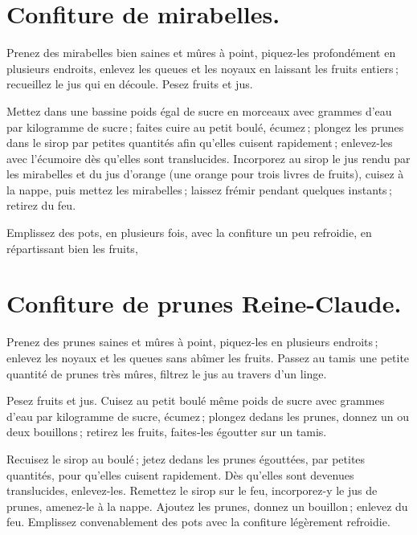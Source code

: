 \section*{\centering Confiture de mirabelles.}
{}

Prenez des mirabelles bien saines et mûres à point, piquez-les profondément en
plusieurs endroits, enlevez les queues et les noyaux en laissant les fruits
entiers ; recueillez le jus qui en découle. Pesez fruits et jus.

Mettez dans une bassine poids égal de sucre en morceaux avec {\mmm}
grammes d'eau par kilogramme de sucre ; faites cuire au petit boulé, écumez ;
plongez les prunes dans le sirop par petites quantités afin qu'elles cuisent
rapidement ; enlevez-les avec l'écumoire dès qu'elles sont translucides.
Incorporez au sirop le jus rendu par les mirabelles et du jus d'orange (une
orange pour trois livres de fruits), cuisez à la nappe, puis mettez les
mirabelles ; laissez frémir pendant quelques instants ; retirez du feu.

Emplissez des pots, en plusieurs fois, avec la confiture un peu refroidie, en
répartissant bien les fruits,

\section*{\centering Confiture de prunes Reine-Claude.}
{}

Prenez des prunes saines et mûres à point, piquez-les en plusieurs endroits ;
enlevez les noyaux et les queues sans abîmer les fruits. Passez au tamis une
petite quantité de prunes très mûres, filtrez le jus au travers d'un linge.

Pesez fruits et jus. Cuisez au petit boulé même poids de sucre avec
{\mmm} grammes d'eau par kilogramme de sucre, écumez ; plongez dedans
les prunes, donnez un ou deux bouillons ; retirez les fruits, faites-les
égoutter sur un tamis.

Recuisez le sirop au boulé ; jetez dedans les prunes égouttées, par petites
quantités, pour qu'elles cuisent rapidement. Dès qu'elles sont devenues
translucides, enlevez-les. Remettez le sirop sur le feu, incorporez-y le jus de
prunes, amenez-le à la nappe. Ajoutez les prunes, donnez un bouillon ; enlevez
du feu. Emplissez convenablement des pots avec la confiture légèrement
refroidie.

